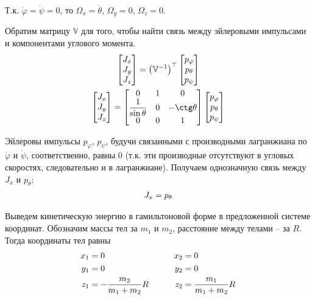 \documentclass[12pt]{article}
\newcommand{\bbV}{\mathbb{V}}
\newcommand{\lb}{\left(}
\newcommand{\rb}{\right)}
\begin{document}
Т.к. $\dot{\varphi} = \dot{\psi} = 0$, то $\Omega_x = \dot{\theta}$, $\Omega_y = 0$, $\Omega_z = 0$.

Обратим матрицу $\bbV$ для того, чтобы найти связь между эйлеровыми импульсами и компонентами углового момента.
\begin{gather}
	\begin{bmatrix}
		J_x \\
		J_y \\
		J_z
	\end{bmatrix} = \lb \bbV^{-1} \rb^\top
	\begin{bmatrix}
		p_\varphi \\
		p_\theta \\
		p_\psi
	\end{bmatrix} \notag \\
	\begin{bmatrix}
		J_x \\
		J_y \\
		J_z 
	\end{bmatrix} = 
	\begin{bmatrix}
		0 & 1 & 0 \\
		\displaystyle \frac{1}{\sin \theta} & 0 & - \ctg \theta \\
		0 & 0 & 1
	\end{bmatrix}
	\begin{bmatrix}
		p_\varphi \\
		p_\theta \\
		p_\psi
	\end{bmatrix} \notag
\end{gather}

Эйлеровы импульсы $p_\varphi$, $p_{\psi}$, будучи связанными с производными лагранжиана по $\dot{\varphi}$ и $\dot{\psi}$, соответственно, равны 0 (т.к. эти производные отсутствуют в угловых скоростях, следовательно и в лагранжиане). Получаем однозначную связь между $J_x$ и $p_\theta$:
\begin{gather}
	J_x = p_\theta \notag
\end{gather}

Выведем кинетическую энергию в гамильтоновой форме в предложенной системе координат. Обозначим массы тел за $m_1$ и $m_2$, расстояние между телами -- за $R$. Тогда координаты тел равны
\begin{gather}
	\begin{aligned}
			x_1 &= 0 \\
			y_1 &= 0 \\
			z_1 &= - \frac{m_2}{m_1 + m_2} R
	\end{aligned}
	\quad \quad \quad
	\begin{aligned}
			x_2 &= 0 \\
			y_2 &= 0 \\
			z_2 &= \frac{m_1}{m_1 + m_2} R 
	\end{aligned} \notag
\end{gather}
\end{document}
